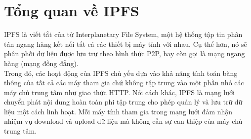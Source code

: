 \section{Tổng quan về IPFS}

IPFS là viết tắt của từ Interplanetary File System, một hệ thống tập tin phân tán ngang hàng kết nối tất cả các thiết bị máy tính với nhau. Cụ thể hơn, nó sẽ phân phối dữ liệu được lưu trữ theo hình thức P2P, hay còn gọi là mạng ngang hàng (mạng đồng đẳng).\\

Trong đó, các hoạt động của IPFS chủ yếu dựa vào khả năng tính toán băng thông của tất cả các máy tham gia chứ không tập trung vào một phần nhỏ các máy chủ trung tâm như giao thức HTTP. Nói cách khác, IPFS là mạng lưới chuyển phát nội dung hoàn toàn phi tập trung cho phép quản lý và lưu trữ dữ liệu một cách linh hoạt. Mỗi máy tính tham gia trong mạng lưới đảm nhận nhiệm vụ download và upload dữ liệu mà không cần sự can thiệp của máy chủ trung tâm.\\


